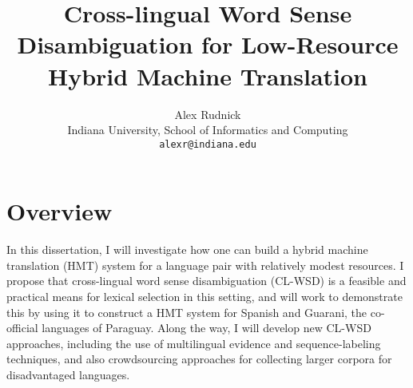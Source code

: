 \documentclass{article}
\title{Cross-lingual Word Sense Disambiguation for Low-Resource Hybrid Machine
Translation}
\author{Alex Rudnick \\
	    Indiana University, School of Informatics and Computing \\
	    {\tt alexr@indiana.edu}}
\date{}
\begin{document}
\maketitle




\section{Overview}


In this dissertation, I will investigate how one can build a hybrid machine
translation (HMT) system for a language pair with relatively modest resources.
I propose that cross-lingual word sense disambiguation (CL-WSD) is a
feasible and practical means for lexical selection in this setting, and will work to
demonstrate this by using it to construct a HMT system for
Spanish and Guarani, the co-official languages of Paraguay.
Along the way, I will develop new CL-WSD approaches, including the use of
multilingual evidence and sequence-labeling techniques, and also crowdsourcing
approaches for collecting larger corpora for disadvantaged languages.
\end{document}
